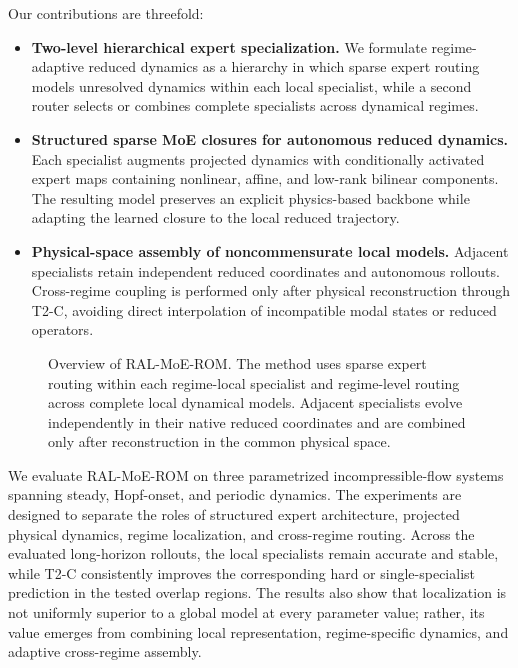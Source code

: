 Our contributions are threefold:
\begin{itemize}
    \item \textbf{Two-level hierarchical expert specialization.}
    We formulate regime-adaptive reduced dynamics as a hierarchy in which sparse expert
    routing models unresolved dynamics within each local specialist, while a second router
    selects or combines complete specialists across dynamical regimes.

    \item \textbf{Structured sparse MoE closures for autonomous reduced dynamics.}
    Each specialist augments projected dynamics with conditionally activated expert maps
    containing nonlinear, affine, and low-rank bilinear components.
    The resulting model preserves an explicit physics-based backbone while adapting the
    learned closure to the local reduced trajectory.

    \item \textbf{Physical-space assembly of noncommensurate local models.}
    Adjacent specialists retain independent reduced coordinates and autonomous rollouts.
    Cross-regime coupling is performed only after physical reconstruction through T2-C,
    avoiding direct interpolation of incompatible modal states or reduced operators.
\end{itemize}

\begin{figure}[t]
    \centering
    \resizebox{\linewidth}{!}{}
    \caption{Overview of RAL-MoE-ROM. The method uses sparse expert routing within each regime-local specialist and regime-level routing across complete local dynamical models. Adjacent specialists evolve independently in their native reduced coordinates and are combined only after reconstruction in the common physical space.}
    \label{fig:ral_overview}
\end{figure}

We evaluate RAL-MoE-ROM on three parametrized incompressible-flow systems spanning steady,
Hopf-onset, and periodic dynamics.
The experiments are designed to separate the roles of structured expert architecture,
projected physical dynamics, regime localization, and cross-regime routing.
Across the evaluated long-horizon rollouts, the local specialists remain accurate and
stable, while T2-C consistently improves the corresponding hard or single-specialist
prediction in the tested overlap regions.
The results also show that localization is not uniformly superior to a global model at every
parameter value; rather, its value emerges from combining local representation,
regime-specific dynamics, and adaptive cross-regime assembly.
